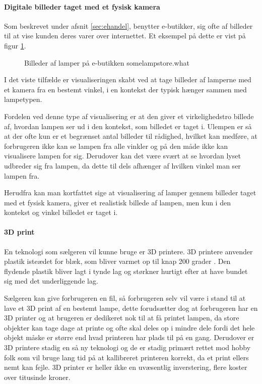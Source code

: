 \paragraph{Digitale billeder taget med et fysisk kamera}
Som beskrevet under afsnit \ref{sec:ehandel}, benytter e-butikker, sig ofte af billeder til at vise kunden deres varer over internettet. Et eksempel på dette er vist på figur \ref{fig:e_handel_lampebilleder}.

\begin{figure}[H]
    \centering
    \fbox{\rule{\textwidth}{5cm}}
    \caption{Billeder af lamper på e-butikken somelampstore.what}
    \label{fig:e_handel_lampebilleder}
\end{figure} 

I det viste tilfælde er visualiseringen skabt ved at tage billeder af lamperne med et kamera fra en bestemt vinkel, i en kontekst der typisk hænger sammen med lampetypen. 

Fordelen ved denne type af visualisering er at den giver et virkelighedstro billede af, hvordan lampen ser ud i den kontekst, som billedet er taget i. Ulempen er så at der ofte kun er et begrænset antal billeder til rådighed, hvilket kan medføre, at forbrugeren ikke kan se lampen fra alle vinkler og på den måde ikke kan visualisere lampen for sig. Derudover kan det være svært at se hvordan lyset udbreder sig fra lampen, da dette til dels afhænger af hvilken vinkel man ser lampen fra. 

Herudfra kan man kortfattet sige at visualisering af lamper gennem billeder taget med et fysisk kamera, giver et realistisk billede af lampen, men kun i den kontekst og vinkel billedet er taget i. 

\paragraph{3D print}
En teknologi som sælgeren vil kunne bruge er 3D printere. 3D printere anvender plastik isteædet for blæk, som bliver varmet op til knap 200 grader \cite{hvordan_3Dprinter}. Den flydende plastik bliver lagt i tynde lag og størkner hurtigt efter at have bundet sig med det underliggende lag. 

Sælgeren kan give forbrugeren en fil, så forbrugeren selv vil være i stand til at lave et 3D print af en bestemt lampe, dette forudsætter dog at forbrugeren har en 3D printer og at brugeren er dedikeret nok til at få printet lampen, da store objekter kan tage dage at printe og ofte skal deles op i mindre dele fordi det hele objekt måske er større end hvad printeren har plads til på en gang\cite{hvordan_3Dprinter}. Derudover er 3D printere stadig en så ny teknologi og de er stadig primært rettet mod hobby folk som vil bruge lang tid på at kallibreret printeren korrekt, da et print ellers nemt kan fejle. 3D printer er heller ikke en uvæsentlig inverstering, flere koster over titusinde kroner\cite{3D_printer}. 

